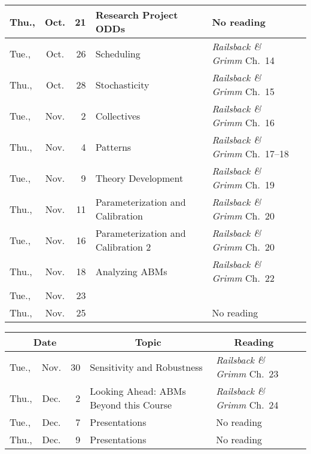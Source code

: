 \documentclass[11pt,twoside]{jgsyllabus}\usepackage[]{graphicx}\usepackage[]{color}
\begin{document}
\begin{center}
\begin{tabular}{l@{~}c@{~}r>{\raggedright}m{2.6in}>{\centering}m{2in}c}
   \midrule
Thu., & Oct. &  21 & Research Project ODDs & No reading &  \\
   \midrule
Tue., & Oct. &  26 & Scheduling & \emph{Railsback \& Grimm\/} Ch.~14 &  \\
   \midrule
Thu., & Oct. &  28 & Stochasticity & \emph{Railsback \& Grimm\/} Ch.~15 &  \\
   \midrule
Tue., & Nov. &   2 & Collectives & \emph{Railsback \& Grimm\/} Ch.~16 &  \\
   \midrule
Thu., & Nov. &   4 & Patterns & \emph{Railsback \& Grimm\/} Ch.~17--18 &  \\
   \midrule
Tue., & Nov. &   9 & Theory Development & \emph{Railsback \& Grimm\/} Ch.~19 &  \\
   \midrule
Thu., & Nov. &  11 & Parameterization and Calibration & \emph{Railsback \& Grimm\/} Ch.~20 &  \\
   \midrule
Tue., & Nov. &  16 & Parameterization and Calibration 2 & \emph{Railsback \& Grimm\/} Ch.~20 &  \\
   \midrule
Thu., & Nov. &  18 & Analyzing ABMs & \emph{Railsback \& Grimm\/} Ch.~22 &  \\
   \midrule
Tue., & Nov. &  23 & \multicolumn{2}{l}{\multirow{3}{*}{\bfseries\scshape\Large Thanksgiving Break}} & \\%
  Thu., & Nov. &  25 &  & No reading &  \\
   \bottomrule
\end{tabular}

\end{center}

\begin{center}
\begin{tabular}{l@{~}c@{~}r>{\raggedright}m{2.6in}>{\centering}m{2in}c}
  \toprule
  \multicolumn{3}{c}{\bfseries Date} & \multicolumn{1}{c}{\bfseries Topic} &\multicolumn{1}{c}{\bfseries Reading} &\\
 \midrule
Tue., & Nov. &  30 & Sensitivity and Robustness & \emph{Railsback \& Grimm\/} Ch.~23 &  \\
   \midrule
Thu., & Dec. &   2 & Looking Ahead: ABMs Beyond this Course & \emph{Railsback \& Grimm\/} Ch.~24 &  \\
   \midrule
Tue., & Dec. &   7 & Presentations & No reading &  \\
   \midrule
Thu., & Dec. &   9 & Presentations & No reading &  \\
   \bottomrule
\end{tabular}

\end{center}
%
\end{document}
